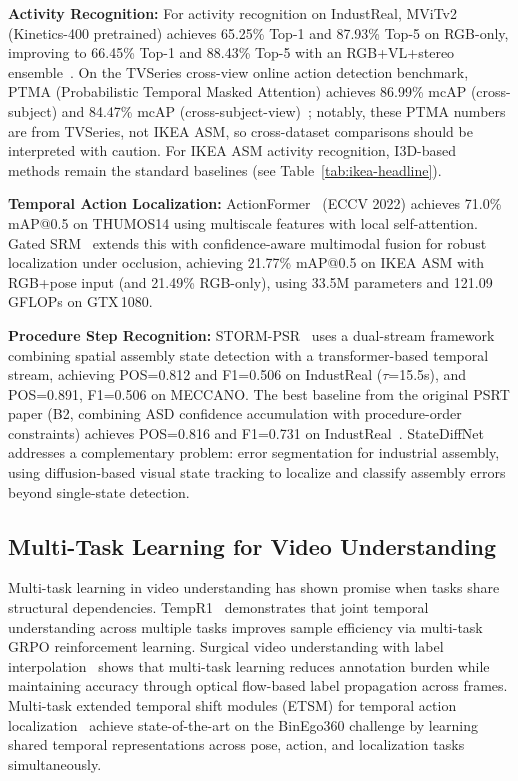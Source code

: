 \documentclass[11pt,a4paper]{article}
\begin{document}
\textbf{Activity Recognition:} For activity recognition on IndustReal, MViTv2 (Kinetics-400 pretrained) achieves 65.25\% Top-1 and 87.93\% Top-5 on RGB-only, improving to 66.45\% Top-1 and 88.43\% Top-5 with an RGB+VL+stereo ensemble~\cite{schoonbeek2024industreal}. On the TVSeries cross-view online action detection benchmark, PTMA (Probabilistic Temporal Masked Attention) achieves 86.99\% mcAP (cross-subject) and 84.47\% mcAP (cross-subject-view)~\cite{xie2025ptma}; notably, these PTMA numbers are from TVSeries, not IKEA ASM, so cross-dataset comparisons should be interpreted with caution. For IKEA ASM activity recognition, I3D-based methods remain the standard baselines (see Table~\ref{tab:ikea-headline}).

\textbf{Temporal Action Localization:} ActionFormer~\cite{zhang2022actionformer} (ECCV 2022) achieves 71.0\% mAP@0.5 on THUMOS14 using multiscale features with local self-attention. Gated SRM~\cite{gatedsrm2026} extends this with confidence-aware multimodal fusion for robust localization under occlusion, achieving 21.77\% mAP@0.5 on IKEA ASM with RGB+pose input (and 21.49\% RGB-only), using 33.5M parameters and 121.09 GFLOPs on GTX\,1080.

\textbf{Procedure Step Recognition:} STORM-PSR~\cite{schoonbeek2025storm} uses a dual-stream framework combining spatial assembly state detection with a transformer-based temporal stream, achieving POS=0.812 and F1=0.506 on IndustReal ($\tau$=15.5s), and POS=0.891, F1=0.506 on MECCANO. The best baseline from the original PSRT paper (B2, combining ASD confidence accumulation with procedure-order constraints) achieves POS=0.816 and F1=0.731 on IndustReal~\cite{schoonbeek2024industreal}. StateDiffNet~\cite{lehman2024statediffnet} addresses a complementary problem: error segmentation for industrial assembly, using diffusion-based visual state tracking to localize and classify assembly errors beyond single-state detection.

\subsection{Multi-Task Learning for Video Understanding}

Multi-task learning in video understanding has shown promise when tasks share structural dependencies. TempR1~\cite{wu2025tempr1} demonstrates that joint temporal understanding across multiple tasks improves sample efficiency via multi-task GRPO reinforcement learning. Surgical video understanding with label interpolation~\cite{kim2025surgical} shows that multi-task learning reduces annotation burden while maintaining accuracy through optical flow-based label propagation across frames. Multi-task extended temporal shift modules (ETSM) for temporal action localization~\cite{duong2025multitask} achieve state-of-the-art on the BinEgo360 challenge by learning shared temporal representations across pose, action, and localization tasks simultaneously.
\end{document}

